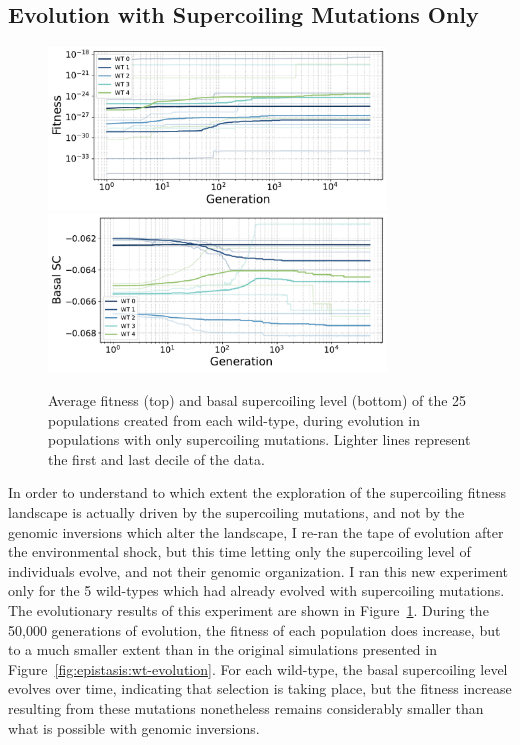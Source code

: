 \subsection{Evolution with Supercoiling Mutations Only}

\begin{figure}[H]
\centering
\includegraphics[width=0.8\textwidth]{epistasis/img/sc-only/fitness_per_wt.pdf}
\includegraphics[width=0.8\textwidth]{epistasis/img/sc-only/sc_per_wt.pdf}
\caption[Average basal supercoiling and fitness during evolution with only basal supercoiling level mutations]{Average fitness (top) and basal supercoiling level (bottom) of the 25 populations created from each wild-type, during evolution in populations with only supercoiling mutations.
Lighter lines represent the first and last decile of the data.}
\label{fig:epistasis:sc-only-evolution}
\end{figure}

In order to understand to which extent the exploration of the supercoiling fitness landscape is actually driven by the supercoiling mutations, and not by the genomic inversions which alter the landscape, I re-ran the tape of evolution after the environmental shock, but this time letting only the supercoiling level of individuals evolve, and not their genomic organization.
I ran this new experiment only for the 5 wild-types which had already evolved with supercoiling mutations.
The evolutionary results of this experiment are shown in Figure~\ref{fig:epistasis:sc-only-evolution}.
During the 50,000 generations of evolution, the fitness of each population does increase, but to a much smaller extent than in the original simulations presented in Figure~\ref{fig:epistasis:wt-evolution}.
For each wild-type, the basal supercoiling level evolves over time, indicating that selection is taking place, but the fitness increase resulting from these mutations nonetheless remains considerably smaller than what is possible with genomic inversions.

